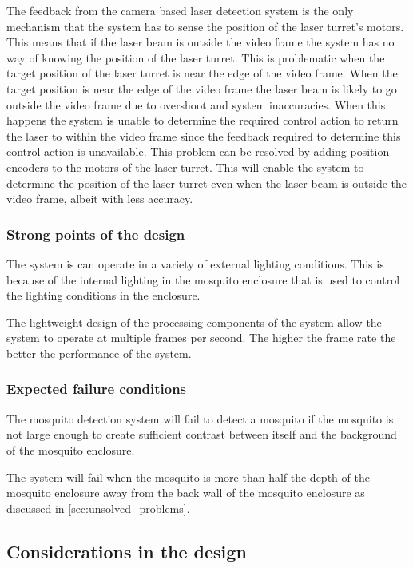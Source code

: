 The feedback from the camera based laser detection system is the only mechanism that the system has to sense the position of the laser turret's motors. This means that if the laser beam is outside the video frame the system has no way of knowing the position of the laser turret. This is problematic when the target position of the laser turret is near the edge of the video frame. When the target position is near the edge of the video frame the laser beam is likely to go outside the video frame due to overshoot and system inaccuracies. When this happens the system is unable to determine the required control action to return the laser to within the video frame since the feedback required to determine this control action is unavailable. This problem can be resolved by adding position encoders to the motors of the laser turret. This will enable the system to determine the position of the laser turret even when the laser beam is outside the video frame, albeit with less accuracy.


\subsubsection{Strong points of the design}
The system is can operate in a variety of external lighting conditions. This is because of the internal lighting in the mosquito enclosure that is used to control the lighting conditions in the enclosure.

The lightweight design of the processing components of the system allow the system to operate at multiple frames per second. The higher the frame rate the better the performance of the system.

\subsubsection{Expected failure conditions}
The mosquito detection system will fail to detect a mosquito if the mosquito is not large enough to create sufficient contrast between itself and the background of the mosquito enclosure.

The system will fail when the mosquito is more than half the depth of the mosquito enclosure away from the back wall of the mosquito enclosure as discussed in \autoref{sec:unsolved_problems}.

\subsection{Considerations in the design}

